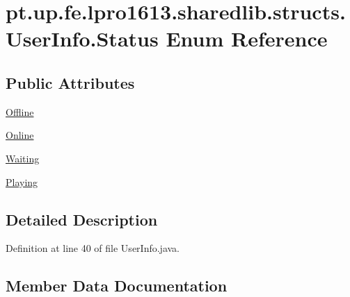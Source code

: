 \hypertarget{enumpt_1_1up_1_1fe_1_1lpro1613_1_1sharedlib_1_1structs_1_1_user_info_1_1_status}{}\section{pt.\+up.\+fe.\+lpro1613.\+sharedlib.\+structs.\+User\+Info.\+Status Enum Reference}
\label{enumpt_1_1up_1_1fe_1_1lpro1613_1_1sharedlib_1_1structs_1_1_user_info_1_1_status}
\subsection*{Public Attributes}
\begin{DoxyCompactItemize}
\item 
\hyperlink{enumpt_1_1up_1_1fe_1_1lpro1613_1_1sharedlib_1_1structs_1_1_user_info_1_1_status_a273fc5ae1413aa191ed87b926ff26107}{Offline}
\item 
\hyperlink{enumpt_1_1up_1_1fe_1_1lpro1613_1_1sharedlib_1_1structs_1_1_user_info_1_1_status_a370401fb9fd867386c9db75f904411a8}{Online}
\item 
\hyperlink{enumpt_1_1up_1_1fe_1_1lpro1613_1_1sharedlib_1_1structs_1_1_user_info_1_1_status_a4f155fcf6ad4f83014128a3099d28909}{Waiting}
\item 
\hyperlink{enumpt_1_1up_1_1fe_1_1lpro1613_1_1sharedlib_1_1structs_1_1_user_info_1_1_status_a41608b6e9d7a9df06710d1547ee51531}{Playing}
\end{DoxyCompactItemize}


\subsection{Detailed Description}


Definition at line 40 of file User\+Info.\+java.



\subsection{Member Data Documentation}
\hypertarget{enumpt_1_1up_1_1fe_1_1lpro1613_1_1sharedlib_1_1structs_1_1_user_info_1_1_status_a273fc5ae1413aa191ed87b926ff26107}{}\label{enumpt_1_1up_1_1fe_1_1lpro1613_1_1sharedlib_1_1structs_1_1_user_info_1_1_status_a273fc5ae1413aa191ed87b926ff26107} 
